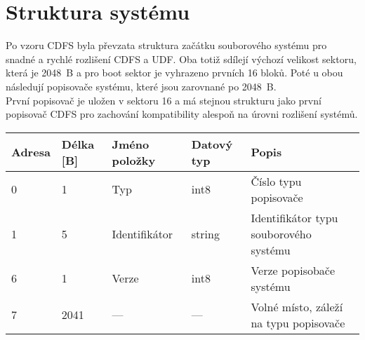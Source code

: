 \section{Struktura systému}
Po vzoru CDFS byla převzata struktura začátku souborového systému pro snadné a rychlé rozlišení CDFS a UDF. Oba totiž sdílejí výchozí velikost sektoru, která je 2048~B a pro boot sektor je vyhrazeno prvních 16 bloků. Poté u obou následují popisovače systému, které jsou zarovnané po 2048~B.\\ 
První popisovač je uložen v sektoru 16 a má stejnou strukturu jako první popisovač CDFS pro zachování kompatibility alespoň na úrovni rozlišení systémů. 
\begin{center}
    \begin{tabular}{ | l | l | l | l | l | }
        \hline
        Adresa  & Délka [B]   & Jméno položky & Datový typ    & Popis \\ \hline
        0       & 1             & Typ           & int8          & Číslo typu popisovače \\ \hline
        1       & 5             & Identifikátor & string        & Identifikátor typu souborového systému \\ \hline
        6       & 1             & Verze         & int8          & Verze popisobače systému \\ \hline
        7       & 2041          & ---           & ---           & Volné místo, záleží na typu popisovače \\ \hline
    \end{tabular}
\end{center}


